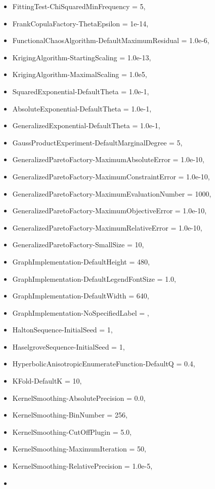 \begin{itemize}
\item
  FittingTest-ChiSquaredMinFrequency = 5,
\item
  FrankCopulaFactory-ThetaEpsilon = 1e-14,
\item
  FunctionalChaosAlgorithm-DefaultMaximumResidual = 1.0e-6,
\item
  KrigingAlgorithm-StartingScaling = 1.0e-13,
\item
  KrigingAlgorithm-MaximalScaling = 1.0e5,
\item
  SquaredExponential-DefaultTheta = 1.0e-1,
\item
  AbsoluteExponential-DefaultTheta = 1.0e-1,
\item
  GeneralizedExponential-DefaultTheta = 1.0e-1,
\item
  GaussProductExperiment-DefaultMarginalDegree = 5,
\item
  GeneralizedParetoFactory-MaximumAbsoluteError = 1.0e-10,
\item
  GeneralizedParetoFactory-MaximumConstraintError = 1.0e-10,
\item
  GeneralizedParetoFactory-MaximumEvaluationNumber = 1000,
\item
  GeneralizedParetoFactory-MaximumObjectiveError = 1.0e-10,
\item
  GeneralizedParetoFactory-MaximumRelativeError = 1.0e-10,
\item
  GeneralizedParetoFactory-SmallSize = 10,
\item
  GraphImplementation-DefaultHeight = 480,
\item
  GraphImplementation-DefaultLegendFontSize = 1.0,
\item
  GraphImplementation-DefaultWidth = 640,
\item
  GraphImplementation-NoSpecifiedLabel = ,
\item
  HaltonSequence-InitialSeed = 1,
\item
  HaselgroveSequence-InitialSeed = 1,
\item
  HyperbolicAnisotropicEnumerateFunction-DefaultQ = 0.4,
\item
  KFold-DefaultK = 10,
\item
  KernelSmoothing-AbsolutePrecision = 0.0,
\item
  KernelSmoothing-BinNumber = 256,
\item
  KernelSmoothing-CutOffPlugin = 5.0,
\item
  KernelSmoothing-MaximumIteration = 50,
\item
  KernelSmoothing-RelativePrecision = 1.0e-5,
\item

\end{itemize}
